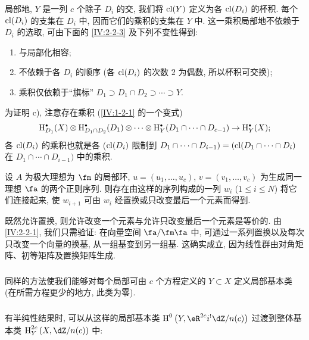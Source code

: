 局部地, $Y$ 是一列 $c$ 个除子 $D_i$ 的交, 我们将 $\operatorname{cl}(Y)$ 定义为各 $\operatorname{cl}(D_i)$ 的杯积.
每个 $\operatorname{cl}(D_i)$ 的支集在 $D_i$ 中, 因而它们的乘积的支集在 $Y$ 中.
这一乘积局部地不依赖于 $D_i$ 的选取, 可由下面的 \ref{IV:2-2-3} 及下列不变性得到:
\begin{enumerate}[\indent a)]
  \item 与局部化相容;
  \item 不依赖于各 $D_i$ 的顺序 (各 $\operatorname{cl}(D_i)$ 的次数 $2$ 为偶数, 所以杯积可交换);
  \item 乘积仅依赖于“旗标”
    $D_1\supset D_1\cap D_2\supset \cdots\supset Y$.
\end{enumerate}
为证明 c), 注意存在乘积 (\ref{IV:1-2-1} 的一个变式)
\[
  \h_{D_1}^\bullet(X)\otimes \h_{D_1\cap D_2}^\bullet(D_1)\otimes \cdots \otimes \h_Y^\bullet(D_1\cap \cdots \cap D_{c-1}) \to \h_Y^\bullet(X) \text{;}
\]
各 $\operatorname{cl}(D_i)$ 的乘积也就是各 ($\operatorname{cl}(D_i)$ 限制到
$D_1\cap \cdots \cap D_{i-1})=(\operatorname{cl}(D_1\cap \cdots \cap D_i)$ 在
$D_1\cap \cdots \cap D_{i-1})$ 中的乘积.

\begin{lemma}\label{IV:2-2-3}
设 $A$ 为极大理想为 $\fm$ 的局部环,
$u=(u_1,\dots,u_c)$, $v=(v_1,\dots,v_c)$ 为生成同一理想 $\fa$ 的两个正则序列.
则存在由这样的序列构成的一列 $w_i$ ($1\leqslant i\leqslant N$) 将它们连接起来,
使 $w_{i+1}$ 可由 $w_i$ 经置换或只改变最后一个元素而得到.
\end{lemma}

既然允许置换, 则允许改变一个元素与允许只改变最后一个元素是等价的.
由 \ref{IV:2-2-1}, 我们只需验证: 在向量空间 $\fa/\fm\fa$ 中,
可通过一系列置换以及每次只改变一个向量的换基, 从一组基变到另一组基.
这确实成立, 因为线性群由对角矩阵、初等矩阵及置换矩阵生成.

\subsubsection{}\label{IV:2-2-4}

同样的方法使我们能够对每个局部可由 $c$ 个方程定义的 $Y\subset X$ 定义局部基本类
(在所需方程更少的地方, 此类为零).

\subsubsection{}\label{IV:2-2-5}

有半纯性结果时, 可以从这样的局部基本类
$\h^0\left(Y,\eR^{2 c} i^!\dZ/n(c)\right)$
过渡到整体基本类 $\h_Y^{2 c}\left(X,\dZ/n(c)\right)$ 中:

